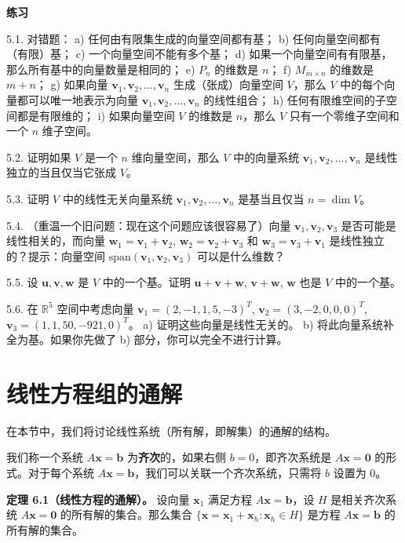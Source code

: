 \textbf{练习}~

5.1. 对错题：
a) 任何由有限集生成的向量空间都有基；
b) 任何向量空间都有（有限）基；
c) 一个向量空间不能有多个基；
d) 如果一个向量空间有有限基，那么所有基中的向量数量是相同的；
e) $P_n$ 的维数是 $n$；
f) $M_{m \times n}$ 的维数是 $m+n$；
g) 如果向量 $\mathbf{v}_1, \mathbf{v}_2, \dots, \mathbf{v}_n$ 生成（张成）向量空间 $V$，那么 $V$ 中的每个向量都可以唯一地表示为向量 $\mathbf{v}_1, \mathbf{v}_2, \dots, \mathbf{v}_n$ 的线性组合；
h) 任何有限维空间的子空间都是有限维的；
i) 如果向量空间 $V$ 的维数是 $n$，那么 $V$ 只有一个零维子空间和一个 $n$ 维子空间。

5.2. 证明如果 $V$ 是一个 $n$ 维向量空间，那么 $V$ 中的向量系统 $\mathbf{v}_1, \mathbf{v}_2, \dots, \mathbf{v}_n$ 是线性独立的当且仅当它张成 $V$。

5.3. 证明 $V$ 中的线性无关向量系统 $\mathbf{v}_1, \mathbf{v}_2, \dots, \mathbf{v}_n$ 是基当且仅当 $n = \dim V$。

5.4. （重温一个旧问题：现在这个问题应该很容易了）向量 $\mathbf{v}_1, \mathbf{v}_2, \mathbf{v}_3$ 是否可能是线性相关的，而向量 $\mathbf{w}_1 = \mathbf{v}_1 + \mathbf{v}_2$, $\mathbf{w}_2 = \mathbf{v}_2 + \mathbf{v}_3$ 和 $\mathbf{w}_3 = \mathbf{v}_3 + \mathbf{v}_1$ 是线性独立的？提示：向量空间 $\text{span}(\mathbf{v}_1, \mathbf{v}_2, \mathbf{v}_3)$ 可以是什么维数？

5.5. 设 $\mathbf{u}, \mathbf{v}, \mathbf{w}$ 是 $V$ 中的一个基。证明 $\mathbf{u}+\mathbf{v}+\mathbf{w}$, $\mathbf{v}+\mathbf{w}$, $\mathbf{w}$ 也是 $V$ 中的一个基。

5.6. 在 $\mathbb{R}^5$ 空间中考虑向量 $\mathbf{v}_1 = (2, -1, 1, 5, -3)^T$, $\mathbf{v}_2 = (3, -2, 0, 0, 0)^T$, $\mathbf{v}_3 = (1, 1, 50, -921, 0)^T$。
a) 证明这些向量是线性无关的。
b) 将此向量系统补全为基。如果你先做了 b) 部分，你可以完全不进行计算。


\section{线性方程组的通解}

在本节中，我们将讨论线性系统（所有解，即解集）的通解的结构。

我们称一个系统 $A \mathbf{x} = \mathbf{b}$ 为\textbf{齐次}的，如果右侧 $b = 0$，即齐次系统是 $A \mathbf{x} = \mathbf{0}$ 的形式。对于每个系统 $A \mathbf{x} = \mathbf{b}$，我们可以关联一个齐次系统，只需将 $b$ 设置为 $0$。

\textbf{定理 6.1（线性方程的通解）。} 设向量 $\mathbf{x}_1$ 满足方程 $A \mathbf{x} = \mathbf{b}$，设 $H$ 是相关齐次系统 $A \mathbf{x} = \mathbf{0}$ 的所有解的集合。那么集合 $\{\mathbf{x} = \mathbf{x}_1 + \mathbf{x}_h : \mathbf{x}_h \in H\}$ 是方程 $A \mathbf{x} = \mathbf{b}$ 的所有解的集合。

